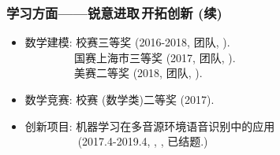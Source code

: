 \documentclass[10pt]{beamer}
\begin{document}
\begin{frame}
\frametitle{学习方面——锐意进取$\,$开拓创新 (续)}
{}
\begin{itemize}
\item 数学建模: 校赛三等奖 (2016-2018, 团队, {\color{red}{队长}}).\\
$\quad\quad\quad\quad\:\:$国赛上海市三等奖 (2017, 团队, {\color{red}{队长}}).\\
$\quad\quad\quad\quad\:\:$美赛二等奖 (2018, 团队, {\color{red}{队长}}).
\item 数学竞赛: 校赛 (数学类)二等奖 (2017).
\item 创新项目: 机器学习在多音源环境语音识别中的应用\\
$\quad\quad\quad\quad\:\:\,\,$(2017.4-2019.4, {\color{red}{国创}}, {\color{red}{负责人}}, 已结题.)
\end{itemize}
\end{frame}
\end{document}
